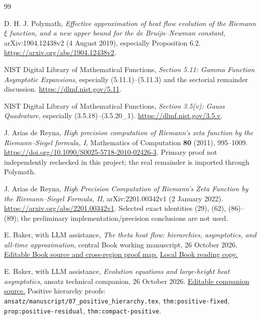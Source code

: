 \begin{thebibliography}{99}
\small\raggedright
{}
D. H. J. Polymath,
\emph{Effective approximation of heat flow evolution of the Riemann
\(\xi\) function, and a new upper bound for the de Bruijn--Newman constant},
arXiv:1904.12438v2 (4 August 2019), especially Proposition 6.2.
\url{https://arxiv.org/abs/1904.12438v2}.

NIST Digital Library of Mathematical Functions,
\emph{Section 5.11: Gamma Function Asymptotic Expansions},
especially (5.11.1)--(5.11.3) and the sectorial remainder discussion.
\url{https://dlmf.nist.gov/5.11}.

NIST Digital Library of Mathematical Functions,
\emph{Section 3.5(v): Gauss Quadrature},
especially (3.5.18)--(3.5.20\_1).
\url{https://dlmf.nist.gov/3.5.v}.

J. Arias de Reyna,
\emph{High precision computation of Riemann's zeta function by the
Riemann--Siegel formula, I},
Mathematics of Computation \textbf{80} (2011), 995--1009.
\url{https://doi.org/10.1090/S0025-5718-2010-02426-3}.
Primary proof not independently rechecked in this project;
the real remainder is imported through Polymath.

J. Arias de Reyna,
\emph{High Precision Computation of Riemann's Zeta Function by the
Riemann--Siegel Formula, II}, arXiv:2201.00342v1 (2 January 2022).
\url{https://arxiv.org/abs/2201.00342v1}.
Selected exact identities (29), (62), (86)--(89);
the preliminary implementation/precision conclusions are not used.

E. Baker, with LLM assistance,
\emph{The theta heat flow: hierarchies, asymptotics, and all-time approximation},
central Book working manuscript, 26 October 2026.
\href{run:../../../papers/investigations-5/01_heat_density_asymptotics/book/main.tex}{Editable Book source and cross-region proof map.}
\href{run:../heat_density_book/heat_density_book.pdf}{Local Book reading copy.}

E. Baker, with LLM assistance,
\emph{Evolution equations and large-height heat asymptotics},
ansatz technical companion, 26 October 2026.
\href{run:../../../papers/investigations-5/01_heat_density_asymptotics/ansatz/manuscript/main.tex}{Editable companion source.}
Positive hierarchy proofs:
\nolinkurl{ansatz/manuscript/07_positive_hierarchy.tex},
\texttt{thm:positive-fixed}, \texttt{prop:positive-residual},
\texttt{thm:compact-positive}.


\end{thebibliography}
